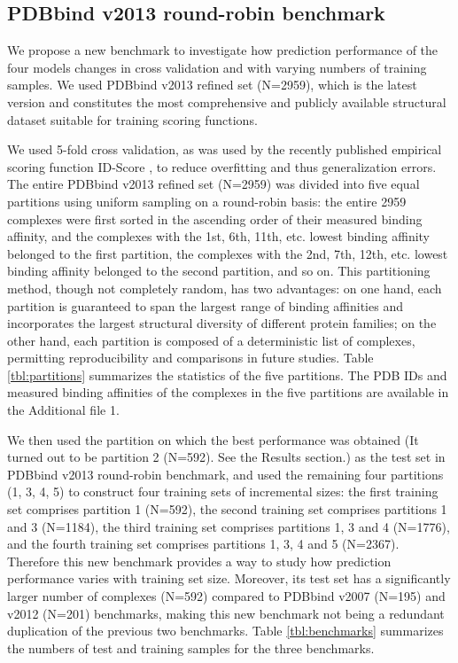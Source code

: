 \documentclass[twocolumn]{bmcart}
\begin{document}
\subsection*{PDBbind v2013 round-robin benchmark}

We propose a new benchmark to investigate how prediction performance of the four models changes in cross validation and with varying numbers of training samples. We used PDBbind v2013 refined set (N=2959), which is the latest version and constitutes the most comprehensive and publicly available structural dataset suitable for training scoring functions.

We used 5-fold cross validation, as was used by the recently published empirical scoring function ID-Score \cite{1305}, to reduce overfitting and thus generalization errors. The entire PDBbind v2013 refined set (N=2959) was divided into five equal partitions using uniform sampling on a round-robin basis: the entire 2959 complexes were first sorted in the ascending order of their measured binding affinity, and the complexes with the 1st, 6th, 11th, etc. lowest binding affinity belonged to the first partition, the complexes with the 2nd, 7th, 12th, etc. lowest binding affinity belonged to the second partition, and so on. This partitioning method, though not completely random, has two advantages: on one hand, each partition is guaranteed to span the largest range of binding affinities and incorporates the largest structural diversity of different protein families; on the other hand, each partition is composed of a deterministic list of complexes, permitting reproducibility and comparisons in future studies. Table \ref{tbl:partitions} summarizes the statistics of the five partitions. The PDB IDs and measured binding affinities of the complexes in the five partitions are available in the Additional file 1.

We then used the partition on which the best performance was obtained (It turned out to be partition 2 (N=592). See the Results section.) as the test set in PDBbind v2013 round-robin benchmark, and used the remaining four partitions (1, 3, 4, 5) to construct four training sets of incremental sizes: the first training set comprises partition 1 (N=592), the second training set comprises partitions 1 and 3 (N=1184), the third training set comprises partitions 1, 3 and 4 (N=1776), and the fourth training set comprises partitions 1, 3, 4 and 5 (N=2367). Therefore this new benchmark provides a way to study how prediction performance varies with training set size. Moreover, its test set has a significantly larger number of complexes (N=592) compared to PDBbind v2007 (N=195) and v2012 (N=201) benchmarks, making this new benchmark not being a redundant duplication of the previous two benchmarks. Table \ref{tbl:benchmarks} summarizes the numbers of test and training samples for the three benchmarks.
\end{document}
